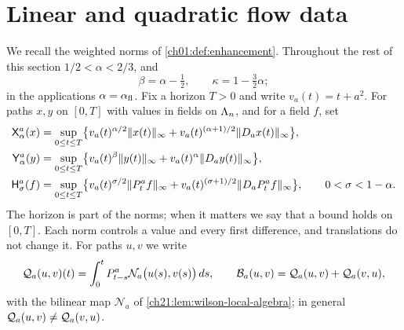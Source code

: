 \section{Linear and quadratic flow data}\label{ch21:sec:data}

We recall the weighted norms of \cref{ch01:def:enhancement}. Throughout the rest of this section $1/2<\alpha<2/3$, and
\[
 \beta=\alpha-\tfrac12,\qquad \kappa=1-\tfrac32\alpha ;
\]
in the applications $\alpha=\alpha_{\mathrm{fl}}$. Fix a horizon $T>0$ and write $v_a(t)=t+a^2$. For paths $x,y$ on $[0,T]$ with values in fields on $\Lambda_{n}$, and for a field $f$, set
\begin{equation}\label{ch21:eq:flow-norms}
 \begin{split}
 \mathsf X_{\alpha}^{a}(x)&=\sup_{0\le t\le T}\bigl\{v_a(t)^{\alpha/2}\lVert x(t)\rVert_\infty+v_a(t)^{(\alpha+1)/2}\lVert D_ax(t)\rVert_\infty\bigr\},\\
 \mathsf Y_{\alpha}^{a}(y)&=\sup_{0\le t\le T}\bigl\{v_a(t)^{\beta}\lVert y(t)\rVert_\infty+v_a(t)^{\alpha}\lVert D_ay(t)\rVert_\infty\bigr\},\\
 \mathsf H_{\sigma}^{a}(f)&=\sup_{0\le t\le T}\bigl\{v_a(t)^{\sigma/2}\lVert P^a_tf\rVert_\infty+v_a(t)^{(\sigma+1)/2}\lVert D_aP^a_tf\rVert_\infty\bigr\},\qquad 0<\sigma<1-\alpha .
 \end{split}
\end{equation}
The horizon is part of the norms; when it matters we say that a bound holds on $[0,T]$. Each norm controls a value and every first difference, and translations do not change it. For paths $u,v$ we write
\[
 \mathcal Q_{a}(u,v)(t)=\int_0^tP^a_{t-s}\mathcal N_a\bigl(u(s),v(s)\bigr)\,ds,\qquad
 \mathcal B_{a}(u,v)=\mathcal Q_{a}(u,v)+\mathcal Q_{a}(v,u),
\]
with the bilinear map $\mathcal N_a$ of \cref{ch21:lem:wilson-local-algebra}; in general $\mathcal Q_{a}(u,v)\neq\mathcal Q_{a}(v,u)$.

